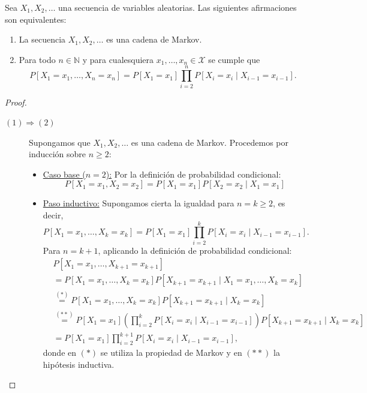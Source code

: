 \documentclass[12pt]{article}
\begin{document}
\begin{prop}
  Sea $X_1, X_2, \ldots$ una secuencia de variables aleatorias. Las siguientes afirmaciones son equivalentes:
  \begin{enumerate}
    \item La secuencia $X_1, X_2, \ldots$ es una cadena de Markov.
    \item Para todo $n \in \mathbb{N}$ y para cualesquiera $x_1, \ldots, x_n \in \mathcal{X}$ se cumple que
    \begin{equation*}
      P[X_1 = x_1, \ldots, X_n = x_n] = P[X_1 = x_1] \prod_{i=2}^{n} P[X_i = x_i \mid X_{i-1} = x_{i-1}].
    \end{equation*}
  \end{enumerate}
\end{prop}
\begin{proof}~
  \begin{description}
    \item[$(1) \Longrightarrow (2)$] Supongamos que $X_1, X_2, \ldots$ es una cadena de Markov. Procedemos por inducción sobre $n \ge 2$:
    \begin{itemize}
      \item \ul{Caso base ($n=2$):} Por la definición de probabilidad condicional:
      \begin{equation*}
        P[X_1 = x_1, X_2 = x_2] = P[X_1 = x_1] P[X_2 = x_2 \mid X_1 = x_1]
      \end{equation*}
      
      \item \ul{Paso inductivo:} Supongamos cierta la igualdad para $n=k \ge 2$, es decir,
      \begin{equation*}
        P[X_1 = x_1, \ldots, X_k = x_k] = P[X_1 = x_1] \prod_{i=2}^{k} P[X_i = x_i \mid X_{i-1} = x_{i-1}].
      \end{equation*}
      Para $n=k+1$, aplicando la definición de probabilidad condicional:
      \begin{align*}
        &P[X_1 = x_1, \ldots, X_{k+1} = x_{k+1}]\\
        &= P[X_1 = x_1, \ldots, X_k = x_k] P[X_{k+1} = x_{k+1} \mid X_1 = x_1, \ldots, X_k = x_k] \\
        &\stackrel{(\ast)}{=} P[X_1 = x_1, \ldots, X_k = x_k] P[X_{k+1} = x_{k+1} \mid X_k = x_k] \\
        &\stackrel{(\ast\ast)}{=} P[X_1 = x_1] \left(\prod_{i=2}^{k} P[X_i = x_i \mid X_{i-1} = x_{i-1}]\right) P[X_{k+1} = x_{k+1} \mid X_k = x_k] \\
        &= P[X_1 = x_1] \prod_{i=2}^{k+1} P[X_i = x_i \mid X_{i-1} = x_{i-1}],
      \end{align*}
      donde en $(\ast)$ se utiliza la propiedad de Markov y en $(\ast\ast)$ la hipótesis inductiva.
    \end{itemize}


\end{description}
\end{proof}
\end{document}
